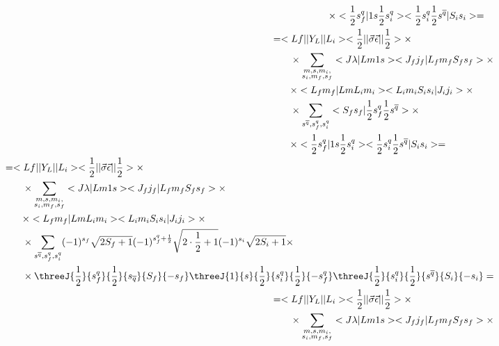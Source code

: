 \begin{align}
\begin{split}
        &\qquad\times <\frac{1}{2} s_f^q| 1 s \frac{1}{2} s_i^q> <\frac{1}{2} s_i^{q} \frac{1}{2} s^{\overline{q}} |S_i s_i> =
    \end{split}\\
    \begin{split}
        &= <Lf|| Y_L ||L_i> <\frac{1}{2}|| \vec{\sigma}\vec{\epsilon} ||\frac{1}{2}> \times \\
        &\qquad\times \sum_{\substack{m, s, m_i,\\ s_i, m_f, s_f}} <J \lambda| L m 1 s> <J_f j_f| L_f m_f S_f s_f> \times \\
        &\qquad\times <L_f m_f| L m L_i m_i> <L_i m_i S_i s_i| J_i j_i> \times \\
        &\qquad\times \sum_{s^{\overline{q}}, s_{f}^{q}, s_i^q} <S_f s_f| \frac{1}{2} s_f^{q} \frac{1}{2} s^{\overline{q}}> \times \\
        &\qquad\times <\frac{1}{2} s_f^q| 1 s \frac{1}{2} s_i^q> <\frac{1}{2} s_i^{q} \frac{1}{2} s^{\overline{q}} |S_i s_i> =
    \end{split}\\
    \begin{split}
        &= <Lf|| Y_L ||L_i> <\frac{1}{2}|| \vec{\sigma}\vec{\epsilon} ||\frac{1}{2}> \times \\
        &\qquad\times \sum_{\substack{m, s, m_i,\\ s_i, m_f, s_f}} <J \lambda| L m 1 s> <J_f j_f| L_f m_f S_f s_f> \times \\
        &\qquad\times <L_f m_f| L m L_i m_i> <L_i m_i S_i s_i| J_i j_i> \times \\
        &\qquad\times \sum_{s^{\overline{q}}, s_{f}^{q}, s_i^q} (-1)^{s_f}\sqrt{2S_f+1} (-1)^{s_f^q + \frac{1}{2}}\sqrt{2 \cdot \frac{1}{2} + 1} (-1)^{s_i} \sqrt{2S_i + 1} \times \\
        &\qquad\times \threeJ{\frac{1}{2}}{s_f^q}{\frac{1}{2}}{s_{\overline{q}}}{S_f}{-s_f} \threeJ{1}{s}{\frac{1}{2}}{s_i^q}{\frac{1}{2}}{-s_f^q} \threeJ{\frac{1}{2}}{s_i^q}{\frac{1}{2}}{s^{\overline{q}}}{S_i}{-s_i}  =
    \end{split}\\
    \begin{split}
        &= <Lf|| Y_L ||L_i> <\frac{1}{2}|| \vec{\sigma}\vec{\epsilon} ||\frac{1}{2}> \times \\
        &\qquad\times \sum_{\substack{m, s, m_i,\\ s_i, m_f, s_f}} <J \lambda| L m 1 s> <J_f j_f| L_f m_f S_f s_f> \times \\

\end{split}
\end{align}

